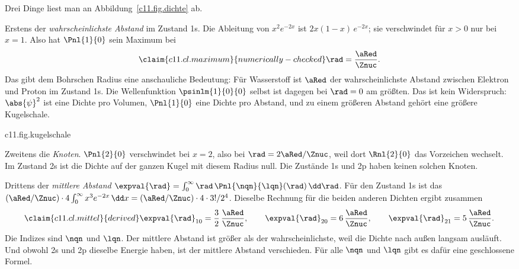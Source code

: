 Drei Dinge liest man an Abbildung~\ref{c11.fig.dichte} ab.

Erstens der \emph{wahrscheinlichste Abstand} im Zustand 1s. Die Ableitung von
$x^2 e^{-2x}$ ist $2x(1 - x)\,e^{-2x}$; sie verschwindet für $x > 0$ nur bei $x = 1$.
Also hat $\Pnl{1}{0}$ sein Maximum bei
\begin{equation}\label{c11.eq.maximum}\claim{c11.cl.maximum}{numerically-checked}
  \rad = \frac{\aRed}{\Znuc} .
\end{equation}
Das gibt dem Bohrschen Radius eine anschauliche Bedeutung: Für Wasserstoff ist $\aRed$
der wahrscheinlichste Abstand zwischen Elektron und Proton im Zustand 1s. Die
Wellenfunktion $\psinlm{1}{0}{0}$ selbst ist dagegen bei $\rad = 0$ am größten. Das ist
kein Widerspruch: $\abs{\psi}^2$ ist eine Dichte pro Volumen, $\Pnl{1}{0}$ eine Dichte
pro Abstand, und zu einem größeren Abstand gehört eine größere Kugelschale.

\begin{tpcfigure}{c11.fig.kugelschale}
  \caption{Warum die radiale Aufenthaltsdichte von 1s bei null beginnt, für $\Znuc = 1$. Gestrichelt: die skalierte Dichte $\pi\aRed^3\abs{\psinlm{1}{0}{0}}^2 = e^{-2x}$ pro Volumen, am Ursprung am größten. Dünn: $\rad^2/\aRed^2 = x^2$, die Kugeloberfläche geteilt durch $4\pi\aRed^2$. Dick: $\aRed\Pnl{1}{0} = 4x^2 e^{-2x}$, die skalierte Dichte pro Abstand, also das Vierfache des Produkts der dünnen und der gestrichelten Kurve; ihr Maximum liegt bei $\rad = \aRed$. Hier ist $x = \rad/\aRed$.}
\end{tpcfigure}

Zweitens die \emph{Knoten}. $\Pnl{2}{0}$ verschwindet bei $x = 2$, also bei
$\rad = 2\aRed/\Znuc$, weil dort $\Rnl{2}{0}$ das Vorzeichen wechselt. Im Zustand 2s ist
die Dichte auf der ganzen Kugel mit diesem Radius null. Die Zustände 1s und 2p haben
keinen solchen Knoten.

Drittens der \emph{mittlere Abstand} $\expval{\rad} = \int_0^\infty \rad\,
\Pnl{\nqn}{\lqn}(\rad)\,\dd\rad$. Für den Zustand 1s ist das
$(\aRed/\Znuc) \cdot 4\int_0^\infty x^3 e^{-2x}\,\dd x = (\aRed/\Znuc) \cdot 4 \cdot
3!/2^4$. Dieselbe Rechnung für die beiden anderen Dichten ergibt zusammen
\begin{equation}\label{c11.eq.mittel}\claim{c11.cl.mittel}{derived}
  \expval{\rad}_{10} = \frac{3}{2}\,\frac{\aRed}{\Znuc},
  \qquad
  \expval{\rad}_{20} = 6\,\frac{\aRed}{\Znuc},
  \qquad
  \expval{\rad}_{21} = 5\,\frac{\aRed}{\Znuc} .
\end{equation}
Die Indizes sind $\nqn$ und $\lqn$. Der mittlere Abstand ist größer als der
wahrscheinlichste, weil die Dichte nach außen langsam ausläuft. Und obwohl 2s und 2p
dieselbe Energie haben, ist der mittlere Abstand verschieden. Für alle $\nqn$ und
$\lqn$ gibt es dafür eine geschlossene Formel.

